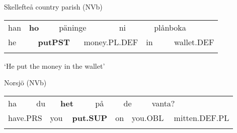 \begin{listWWNumileveli}
\item {}

\begin{styleExample}
Skellefteå country parish (NVb)

\end{styleExample}

\end{listWWNumileveli}

\begin{tabular}{llllllllll}
\lsptoprule
han & \multicolumn{2}{l}{{\bfseries ho}

} & \multicolumn{2}{l}{päninge

} & \multicolumn{2}{l}{ni

} & \multicolumn{2}{l}{plånboka

} & \\
\multicolumn{2}{l}{he

} & \multicolumn{2}{l}{{\bfseries putPST}

} & \multicolumn{2}{l}{money.PL.DEF

} & \multicolumn{2}{l}{in

} & \multicolumn{2}{l}{wallet.DEF

}\\
\lspbottomrule
\end{tabular}

\begin{styleTranslation}
‘He put the money in the wallet’

\end{styleTranslation}

\begin{listWWNumileveli}
\item {}

\begin{styleExample}
Norsjö (NVb)

\end{styleExample}

\end{listWWNumileveli}

\begin{tabular}{llllllllllll}
\lsptoprule
ha & \multicolumn{2}{l}{du

} & \multicolumn{2}{l}{{\bfseries het}

} & \multicolumn{2}{l}{på

} & \multicolumn{2}{l}{de

} & \multicolumn{2}{l}{vanta?

} & \\
\multicolumn{2}{l}{have.PRS

} & \multicolumn{2}{l}{you

} & \multicolumn{2}{l}{{\bfseries put.SUP}

} & \multicolumn{2}{l}{on

} & \multicolumn{2}{l}{you.OBL

} & \multicolumn{2}{l}{mitten.DEF.PL

}\\
\lspbottomrule
\end{tabular}

